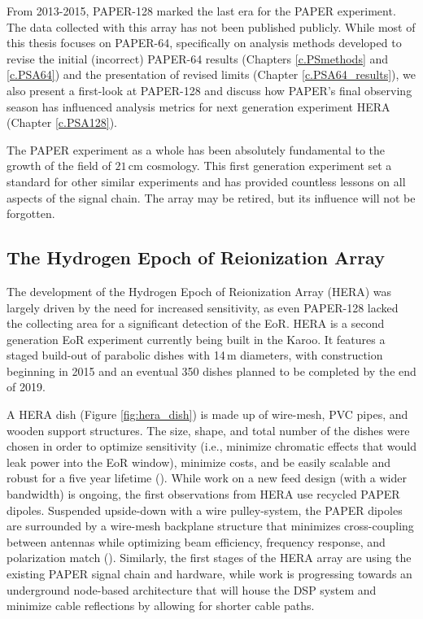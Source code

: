 From 2013-2015, PAPER-128 marked the last era for the PAPER experiment. The data collected with this array has not been published publicly. While most of this thesis focuses on PAPER-64, specifically on analysis methods developed to revise the initial (incorrect) PAPER-64 results (Chapters \ref{c.PSmethods} and \ref{c.PSA64}) and the presentation of revised limits (Chapter \ref{c.PSA64_results}), we also present a first-look at PAPER-128 and discuss how PAPER's final observing season has influenced analysis metrics for next generation experiment HERA (Chapter \ref{c.PSA128}).

The PAPER experiment as a whole has been absolutely fundamental to the growth of the field of $21$\,cm cosmology. This first generation experiment set a standard for other similar experiments and has provided countless lessons on all aspects of the signal chain. The array may be retired, but its influence will not be forgotten.

\subsection{The Hydrogen Epoch of Reionization Array}

The development of the Hydrogen Epoch of Reionization Array (HERA) was largely driven by the need for increased sensitivity, as even PAPER-128 lacked the collecting area for a significant detection of the EoR. HERA is a second generation EoR experiment currently being built in the Karoo. It features a staged build-out of parabolic dishes with 14\,m diameters, with construction beginning in 2015 and an eventual 350 dishes planned to be completed by the end of 2019.

A HERA dish (Figure \ref{fig:hera_dish}) is made up of wire-mesh, PVC pipes, and wooden support structures. The size, shape, and total number of the dishes were chosen in order to optimize sensitivity (i.e., minimize chromatic effects that would leak power into the EoR window), minimize costs, and be easily scalable and robust for a five year lifetime (\citealt{deboer_et_al2017}). While work on a new feed design (with a wider bandwidth) is ongoing, the first observations from HERA use recycled PAPER dipoles. Suspended upside-down with a wire pulley-system, the PAPER dipoles are surrounded by a wire-mesh backplane structure that minimizes cross-coupling between antennas while optimizing beam efficiency, frequency response, and polarization match (\citealt{deboer_et_al2017}). Similarly, the first stages of the HERA array are using the existing PAPER signal chain and hardware, while work is progressing towards an underground node-based architecture that will house the DSP system and minimize cable reflections by allowing for shorter cable paths. 

